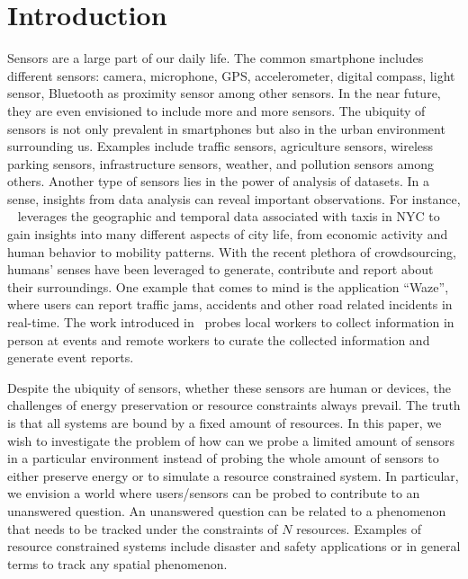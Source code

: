 \documentclass{acm_proc_article-sp}
\begin{document}
\section{Introduction}
Sensors are a large part of our daily life. The common smartphone includes different sensors: camera, microphone, GPS, accelerometer, digital compass, light sensor, Bluetooth as proximity sensor among other sensors. In the near future, they are even envisioned to include more and more sensors. The ubiquity of sensors is not only prevalent in smartphones but also in the urban environment surrounding us. Examples include traffic sensors, agriculture sensors, wireless parking sensors, infrastructure sensors, weather, and pollution sensors among others. Another type of sensors lies in the power of analysis of datasets. In a sense, insights from data analysis can reveal important observations. For instance, ~\cite{ferreira2013visual} leverages the geographic and temporal data associated with taxis in NYC to gain insights into many different aspects of city life, from economic activity and human behavior to mobility patterns. With the recent plethora of crowdsourcing, humans' senses have been leveraged to generate, contribute and report about their surroundings. One example that comes to mind is the application ``Waze'', where users can report traffic jams, accidents and other road related incidents in real-time. The work introduced in~\cite{agapie2015crowdsourcing} probes local workers to collect information in person at events and remote workers to curate the collected information and generate event reports.\par

Despite the ubiquity of sensors, whether these sensors are human or devices, the challenges of energy preservation or resource constraints always prevail. The truth is that all systems are bound by a fixed amount of resources. In this paper, we wish to investigate the problem of how can we probe a limited amount of sensors in a particular environment instead of probing the whole amount of sensors to either preserve energy or to simulate a resource constrained system. In particular, we envision a world where users/sensors can be probed to contribute to an unanswered question. An unanswered question can be related to a phenomenon that needs to be tracked under the constraints of $N$ resources. Examples of resource constrained systems include disaster and safety applications or in general terms to track any spatial phenomenon.\par
\end{document}

